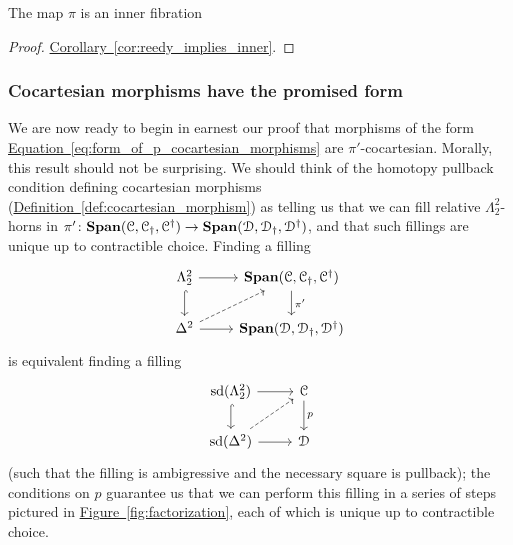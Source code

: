 \documentclass[main.tex]{subfiles}
\begin{document}
\begin{corollary}
  The map $\pi$ is an inner fibration
\end{corollary}
\begin{proof}
  \hyperref[cor:reedy_implies_inner]{Corollary~\ref*{cor:reedy_implies_inner}}.
\end{proof}

\subsubsection{Cocartesian morphisms have the promised form}
\label{sss:cocartesian_morphisms_have_the_promised_form}

We are now ready to begin in earnest our proof that morphisms of the form \hyperref[eq:form_of_p_cocartesian_morphisms]{Equation~\ref*{eq:form_of_p_cocartesian_morphisms}} are $\pi'$-cocartesian. Morally, this result should not be surprising. We should think of the homotopy pullback condition defining cocartesian morphisms (\hyperref[def:cocartesian_morphism]{Definition~\ref*{def:cocartesian_morphism}}) as telling us that we can fill relative $\Lambda^{2}_{2}$-horns in $\pi'\colon \mathbf{Span}(\mathcal{C}, \mathcal{C}_{\dagger}, \mathcal{C}^{\dagger}) \to \mathbf{Span}(\mathcal{D}, \mathcal{D}_{\dagger}, \mathcal{D}^{\dagger})$, and that such fillings are unique up to contractible choice. Finding a filling 
\begin{equation*}
  \begin{tikzcd}
    \Lambda^{2}_{2}
    \arrow[r]
    \arrow[d, hook]
    & \SPAN\triple{C}
    \arrow[d, "\pi'"]
    \\
    \Delta^{2}
    \arrow[r]
    \arrow[ur, dashed]
    & \SPAN\triple{D}
  \end{tikzcd}
\end{equation*}
is equivalent finding a filling
\begin{equation*}
  \begin{tikzcd}
    \sd(\Lambda^{2}_{2})
    \arrow[r]
    \arrow[d, hook]
    & \category{C}
    \arrow[d, "p"]
    \\
    \sd(\Delta^{2})
    \arrow[r]
    \arrow[ur, dashed]
    & \category{D}
  \end{tikzcd}
\end{equation*}
(such that the filling is ambigressive and the necessary square is pullback); the conditions on $p$ guarantee us that we can perform this filling in a series of steps pictured in \hyperref[fig:factorization]{Figure~\ref*{fig:factorization}}, each of which is unique up to contractible choice.
\end{document}
